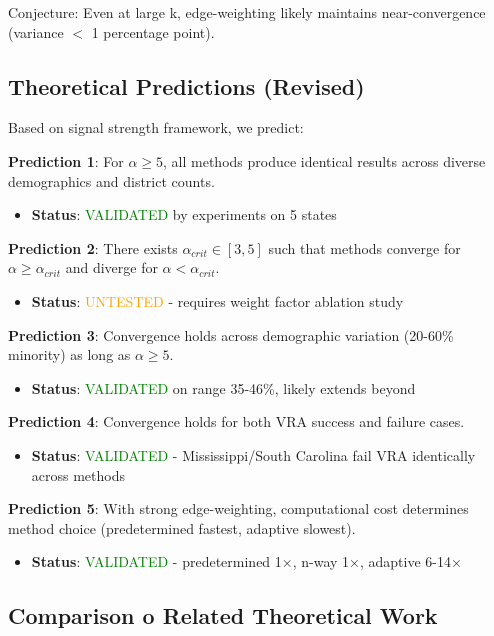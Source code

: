 Conjecture: Even at large k, edge-weighting likely maintains near-convergence (variance $<$ 1 percentage point).

\subsection{Theoretical Predictions (Revised)}

Based on signal strength framework, we predict:

\textbf{Prediction 1}: For $\alpha \geq 5$, all methods produce identical results across diverse demographics and district counts.
\begin{itemize}
\item \textbf{Status}: \textcolor{green}{VALIDATED} by experiments on 5 states
\end{itemize}

\textbf{Prediction 2}: There exists $\alpha_{crit} \in [3, 5]$ such that methods converge for $\alpha \geq \alpha_{crit}$ and diverge for $\alpha < \alpha_{crit}$.
\begin{itemize}
\item \textbf{Status}: \textcolor{orange}{UNTESTED} - requires weight factor ablation study
\end{itemize}

\textbf{Prediction 3}: Convergence holds across demographic variation (20-60\% minority) as long as $\alpha \geq 5$.
\begin{itemize}
\item \textbf{Status}: \textcolor{green}{VALIDATED} on range 35-46\%, likely extends beyond
\end{itemize}

\textbf{Prediction 4}: Convergence holds for both VRA success and failure cases.
\begin{itemize}
\item \textbf{Status}: \textcolor{green}{VALIDATED} - Mississippi/South Carolina fail VRA identically across methods
\end{itemize}

\textbf{Prediction 5}: With strong edge-weighting, computational cost determines method choice (predetermined fastest, adaptive slowest).
\begin{itemize}
\item \textbf{Status}: \textcolor{green}{VALIDATED} - predetermined 1×, n-way 1×, adaptive 6-14×
\end{itemize}

\subsection{Comparison 	o Related Theoretical Work}

